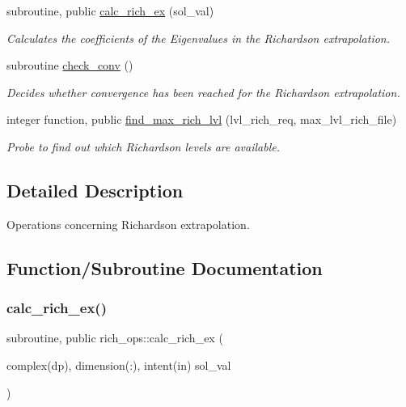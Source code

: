 \begin{DoxyCompactItemize}
subroutine, public \hyperlink{namespacerich__ops_ad2717df0206a397d0d7845a96aa5da23}{calc\+\_\+rich\+\_\+ex} (sol\+\_\+val)
\begin{DoxyCompactList}\small\item\em Calculates the coefficients of the Eigenvalues in the Richardson extrapolation. \end{DoxyCompactList}\item 
subroutine \hyperlink{namespacerich__ops_ac00cce686d45540b238b3b6e39c9bdeb}{check\+\_\+conv} ()
\begin{DoxyCompactList}\small\item\em Decides whether convergence has been reached for the Richardson extrapolation. \end{DoxyCompactList}\item 
integer function, public \hyperlink{namespacerich__ops_a58e1bed1bed5c2d0b91cc7dc5e3099d9}{find\+\_\+max\+\_\+rich\+\_\+lvl} (lvl\+\_\+rich\+\_\+req, max\+\_\+lvl\+\_\+rich\+\_\+file)
\begin{DoxyCompactList}\small\item\em Probe to find out which Richardson levels are available. \end{DoxyCompactList}\end{DoxyCompactItemize}


\subsection{Detailed Description}
Operations concerning Richardson extrapolation. 

\subsection{Function/\+Subroutine Documentation}
\mbox{\label{namespacerich__ops_ad2717df0206a397d0d7845a96aa5da23}} 
\subsubsection{\texorpdfstring{calc\+\_\+rich\+\_\+ex()}{calc\_rich\_ex()}}
{\footnotesize\ttfamily subroutine, public rich\+\_\+ops\+::calc\+\_\+rich\+\_\+ex (\begin{DoxyParamCaption}\item[{complex(dp), dimension(\+:), intent(in)}]{sol\+\_\+val }\end{DoxyParamCaption})}




